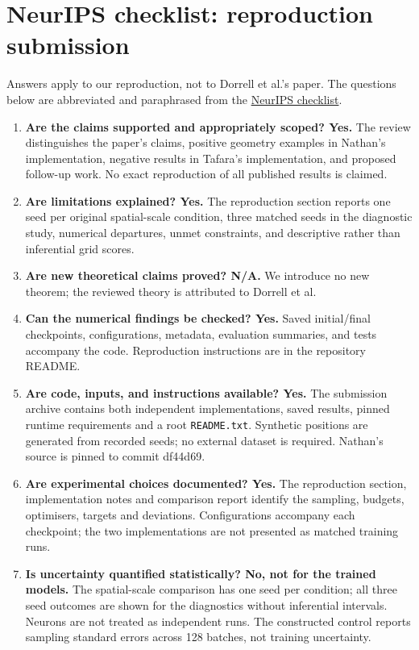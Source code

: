 \section{NeurIPS checklist: reproduction submission}
\noindent Answers apply to our reproduction, not to Dorrell et al.'s paper. The questions below are abbreviated and paraphrased from the \href{https://neurips.cc/public/guides/PaperChecklist}{NeurIPS checklist}.
\begin{enumerate}
\item \textbf{Are the claims supported and appropriately scoped? Yes.} The review distinguishes the paper's claims, positive geometry examples in Nathan's implementation, negative results in Tafara's implementation, and proposed follow-up work. No exact reproduction of all published results is claimed.
\item \textbf{Are limitations explained? Yes.} The reproduction section reports one seed per original spatial-scale condition, three matched seeds in the diagnostic study, numerical departures, unmet constraints, and descriptive rather than inferential grid scores.
\item \textbf{Are new theoretical claims proved? N/A.} We introduce no new theorem; the reviewed theory is attributed to Dorrell et al.
\item \textbf{Can the numerical findings be checked? Yes.} Saved initial/final checkpoints, configurations, metadata, evaluation summaries, and tests accompany the code. Reproduction instructions are in the repository README.
\item \textbf{Are code, inputs, and instructions available? Yes.} The submission archive contains both independent implementations, saved results, pinned runtime requirements and a root \texttt{README.txt}. Synthetic positions are generated from recorded seeds; no external dataset is required. Nathan's source is pinned to commit df44d69.
\item \textbf{Are experimental choices documented? Yes.} The reproduction section, implementation notes and comparison report identify the sampling, budgets, optimisers, targets and deviations. Configurations accompany each checkpoint; the two implementations are not presented as matched training runs.
\item \textbf{Is uncertainty quantified statistically? No, not for the trained models.} The spatial-scale comparison has one seed per condition; all three seed outcomes are shown for the diagnostics without inferential intervals. Neurons are not treated as independent runs. The constructed control reports sampling standard errors across 128 batches, not training uncertainty.

\end{enumerate}
